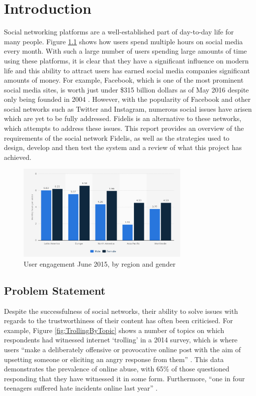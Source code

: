 \chapter{Introduction}
\label{Chapter:Introduction}

Social networking platforms are a well-established part of day-to-day life for many people. Figure \ref{fig:SocialMediaRegionGender} shows how users spend multiple hours on social media every month. With such a large number of users spending large amounts of time using these platforms, it is clear that they have a significant influence on modern life and this ability to attract users has earned social media companies significant amounts of money. For example, Facebook, which is one of the most prominent social media sites, is worth just under \$315 billion dollars as of May 2016 despite only being founded in 2004 \cite{Forbes:Facebook}. However, with the popularity of Facebook and other social networks such as Twitter and Instagram, numerous social issues have arisen which are yet to be fully addressed. Fidelis is an alternative to these networks, which attempts to address these issues. This report provides an overview of the requirements of the social network Fidelis, as well as the strategies used to design, develop and then test the system and a review of what this project has achieved.

\begin{figure}[H]
  \centering
  \includegraphics[width=0.75\textwidth]{Images/Introduction/SocialMediaRegionGender}
  \caption{User engagement June 2015, by region and gender \cite{Statista:SocialMediaRegionGender}} \label{fig:SocialMediaRegionGender} 
\end{figure}


\section{Problem Statement}
\label{Section:ProblemStatement}
Despite the successfulness of social networks, their ability to solve issues with regards to the trustworthiness of their content has often been criticised. For example, Figure \ref{fig:TrollingByTopic} shows a number of topics on which respondents had witnessed internet `trolling' in a 2014 survey, which is where users ``make a deliberately offensive or provocative online post with the aim of upsetting someone or eliciting an angry response from them'' \cite{Oxford:Trolling}. This data demonstrates the prevalence of online abuse, with 65\% of those questioned responding that they have witnessed it in some form. Furthermore, ``one in four teenagers suffered hate incidents online last year'' \cite{Gani:Trolling}.

